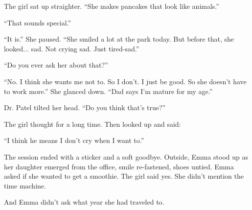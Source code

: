 The girl sat up straighter. ``She makes pancakes that look like animals.''

``That sounds special.''

``It is.'' She paused. ``She smiled a lot at the park today. But before that, she looked... sad. Not crying sad. Just tired-sad.''

``Do you ever ask her about that?''

``No. I think she wants me not to. So I don’t. I just be good. So she doesn’t have to work more.''  
She glanced down. ``Dad says I’m mature for my age.''

Dr. Patel tilted her head. ``Do you think that’s true?''

The girl thought for a long time. Then looked up and said:

``I think he means I don’t cry when I want to.''



The session ended with a sticker and a soft goodbye. Outside, Emma stood up as her daughter emerged from the office, smile re-fastened, shoes untied. Emma asked if she wanted to get a smoothie. The girl said yes. She didn’t mention the time machine.

And Emma didn’t ask what year she had traveled to.

\medskip

